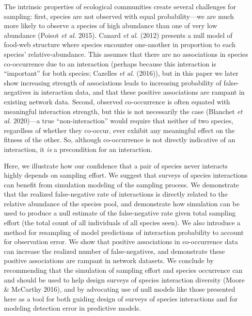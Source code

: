 \documentclass[10pt,oneside]{article}
\begin{document}
The intrinsic properties of ecological communities create several
challenges for sampling: first, species are not observed with equal
probability---we are much more likely to observe a species of high
abundance than one of very low abundance (Poisot \emph{et al.} 2015).
Canard \emph{et al.} (2012) presents a null model of food-web structure
where species encounter one-another in proportion to each species'
relative-abundance. This assumes that there are no associations in
species co-occurrence due to an interaction (perhaps because this
interaction is ``important'' for both species; Cazelles \emph{et al.}
(2016)), but in this paper we later show increasing strength of
associations leads to increasing probability of false-negatives in
interaction data, and that these positive associations are rampant in
existing network data. Second, observed co-occurrence is often equated
with meaningful interaction strength, but this is not necessarily the
case (Blanchet \emph{et al.} 2020)---a true ``non-interaction'' would
require that neither of two species, regardless of whether they
co-occur, ever exhibit any meaningful effect on the fitness of the
other. So, although co-occurrence is not directly indicative of an
interaction, it \emph{is} a precondition for an interaction.

Here, we illustrate how our confidence that a pair of species never
interacts highly depends on sampling effort. We suggest that surveys of
species interactions can benefit from simulation modeling of the
sampling process. We demonstrate that the realized false-negative rate
of interactions is directly related to the relative abundance of the
species pool, and demonstrate how simulation can be used to produce a
null estimate of the false-negative rate given total sampling effort
(the total count of all individuals of all species seen). We also
introduce a method for resampling of model predictions of interaction
probability to account for observation error. We show that positive
associations in co-occurrence data can increase the realized number of
false-negatives, and demonstrate these positive associations are rampant
in network datasets. We conclude by recommending that the simulation of
sampling effort and species occurrence can and should be used to help
design surveys of species interaction diversity (Moore \& McCarthy
2016), and by advocating use of null models like those presented here as
a tool for both guiding design of surveys of species interactions and
for modeling detection error in predictive models.
\end{document}
